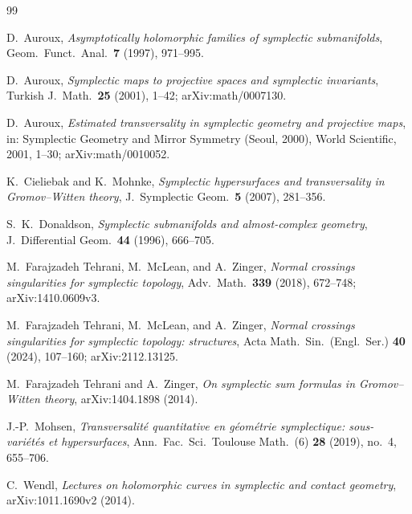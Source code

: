 \documentclass[11pt]{article}
\theoremstyle{remark}
\begin{document}
\begin{thebibliography}{99}

D.~Auroux,
\emph{Asymptotically holomorphic families of symplectic submanifolds},
Geom.\ Funct.\ Anal.\ \textbf{7} (1997), 971--995.

D.~Auroux,
\emph{Symplectic maps to projective spaces and symplectic invariants},
Turkish J.\ Math.\ \textbf{25} (2001), 1--42; arXiv:math/0007130.

D.~Auroux,
\emph{Estimated transversality in symplectic geometry and projective maps},
in: Symplectic Geometry and Mirror Symmetry (Seoul, 2000), World
Scientific, 2001, 1--30; arXiv:math/0010052.

K.~Cieliebak and K.~Mohnke,
\emph{Symplectic hypersurfaces and transversality in Gromov--Witten theory},
J.\ Symplectic Geom.\ \textbf{5} (2007), 281--356.

S.~K.~Donaldson,
\emph{Symplectic submanifolds and almost-complex geometry},
J.\ Differential Geom.\ \textbf{44} (1996), 666--705.

M.~Farajzadeh Tehrani, M.~McLean, and A.~Zinger,
\emph{Normal crossings singularities for symplectic topology},
Adv.\ Math.\ \textbf{339} (2018), 672--748; arXiv:1410.0609v3.

M.~Farajzadeh Tehrani, M.~McLean, and A.~Zinger,
\emph{Normal crossings singularities for symplectic topology: structures},
Acta Math.\ Sin.\ (Engl.\ Ser.) \textbf{40} (2024), 107--160;
arXiv:2112.13125.

M.~Farajzadeh Tehrani and A.~Zinger,
\emph{On symplectic sum formulas in Gromov--Witten theory},
arXiv:1404.1898 (2014).

J.-P.~Mohsen,
\emph{Transversalit\'e quantitative en g\'eom\'etrie symplectique:
sous-vari\'et\'es et hypersurfaces},
Ann.\ Fac.\ Sci.\ Toulouse Math.\ (6) \textbf{28} (2019), no.~4, 655--706.

C.~Wendl,
\emph{Lectures on holomorphic curves in symplectic and contact geometry},
arXiv:1011.1690v2 (2014).

\end{thebibliography}
\end{document}
